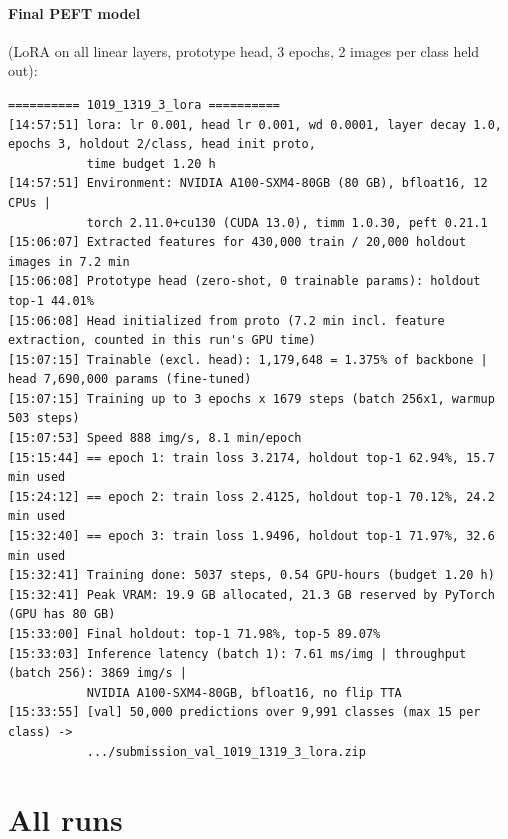 \paragraph{Final PEFT model} (LoRA on all linear layers, prototype head, 3 epochs, 2 images per class held out):
{\scriptsize
\begin{verbatim}
========== 1019_1319_3_lora ==========
[14:57:51] lora: lr 0.001, head lr 0.001, wd 0.0001, layer decay 1.0, epochs 3, holdout 2/class, head init proto,
           time budget 1.20 h
[14:57:51] Environment: NVIDIA A100-SXM4-80GB (80 GB), bfloat16, 12 CPUs |
           torch 2.11.0+cu130 (CUDA 13.0), timm 1.0.30, peft 0.21.1
[15:06:07] Extracted features for 430,000 train / 20,000 holdout images in 7.2 min
[15:06:08] Prototype head (zero-shot, 0 trainable params): holdout top-1 44.01%
[15:06:08] Head initialized from proto (7.2 min incl. feature extraction, counted in this run's GPU time)
[15:07:15] Trainable (excl. head): 1,179,648 = 1.375% of backbone | head 7,690,000 params (fine-tuned)
[15:07:15] Training up to 3 epochs x 1679 steps (batch 256x1, warmup 503 steps)
[15:07:53] Speed 888 img/s, 8.1 min/epoch
[15:15:44] == epoch 1: train loss 3.2174, holdout top-1 62.94%, 15.7 min used
[15:24:12] == epoch 2: train loss 2.4125, holdout top-1 70.12%, 24.2 min used
[15:32:40] == epoch 3: train loss 1.9496, holdout top-1 71.97%, 32.6 min used
[15:32:41] Training done: 5037 steps, 0.54 GPU-hours (budget 1.20 h)
[15:32:41] Peak VRAM: 19.9 GB allocated, 21.3 GB reserved by PyTorch (GPU has 80 GB)
[15:33:00] Final holdout: top-1 71.98%, top-5 89.07%
[15:33:03] Inference latency (batch 1): 7.61 ms/img | throughput (batch 256): 3869 img/s |
           NVIDIA A100-SXM4-80GB, bfloat16, no flip TTA
[15:33:55] [val] 50,000 predictions over 9,991 classes (max 15 per class) ->
           .../submission_val_1019_1319_3_lora.zip
\end{verbatim}
}

\clearpage %
\section{All runs}
\label{sec:all-runs}

